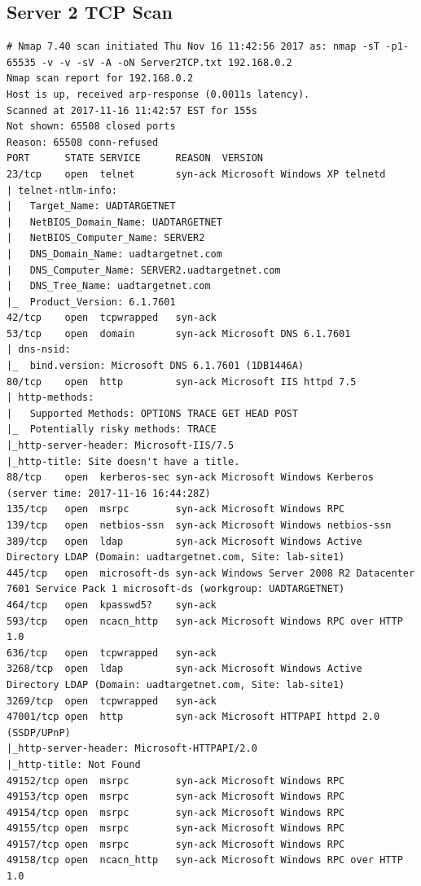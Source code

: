 \documentclass[12pt,a4paper]{article}
\begin{document}
\begin{appendices}
	\subsection{Server 2 TCP Scan}
		\begin{lstlisting}
# Nmap 7.40 scan initiated Thu Nov 16 11:42:56 2017 as: nmap -sT -p1-65535 -v -v -sV -A -oN Server2TCP.txt 192.168.0.2
Nmap scan report for 192.168.0.2
Host is up, received arp-response (0.0011s latency).
Scanned at 2017-11-16 11:42:57 EST for 155s
Not shown: 65508 closed ports
Reason: 65508 conn-refused
PORT      STATE SERVICE      REASON  VERSION
23/tcp    open  telnet       syn-ack Microsoft Windows XP telnetd
| telnet-ntlm-info:
|   Target_Name: UADTARGETNET
|   NetBIOS_Domain_Name: UADTARGETNET
|   NetBIOS_Computer_Name: SERVER2
|   DNS_Domain_Name: uadtargetnet.com
|   DNS_Computer_Name: SERVER2.uadtargetnet.com
|   DNS_Tree_Name: uadtargetnet.com
|_  Product_Version: 6.1.7601
42/tcp    open  tcpwrapped   syn-ack
53/tcp    open  domain       syn-ack Microsoft DNS 6.1.7601
| dns-nsid:
|_  bind.version: Microsoft DNS 6.1.7601 (1DB1446A)
80/tcp    open  http         syn-ack Microsoft IIS httpd 7.5
| http-methods:
|   Supported Methods: OPTIONS TRACE GET HEAD POST
|_  Potentially risky methods: TRACE
|_http-server-header: Microsoft-IIS/7.5
|_http-title: Site doesn't have a title.
88/tcp    open  kerberos-sec syn-ack Microsoft Windows Kerberos (server time: 2017-11-16 16:44:28Z)
135/tcp   open  msrpc        syn-ack Microsoft Windows RPC
139/tcp   open  netbios-ssn  syn-ack Microsoft Windows netbios-ssn
389/tcp   open  ldap         syn-ack Microsoft Windows Active Directory LDAP (Domain: uadtargetnet.com, Site: lab-site1)
445/tcp   open  microsoft-ds syn-ack Windows Server 2008 R2 Datacenter 7601 Service Pack 1 microsoft-ds (workgroup: UADTARGETNET)
464/tcp   open  kpasswd5?    syn-ack
593/tcp   open  ncacn_http   syn-ack Microsoft Windows RPC over HTTP 1.0
636/tcp   open  tcpwrapped   syn-ack
3268/tcp  open  ldap         syn-ack Microsoft Windows Active Directory LDAP (Domain: uadtargetnet.com, Site: lab-site1)
3269/tcp  open  tcpwrapped   syn-ack
47001/tcp open  http         syn-ack Microsoft HTTPAPI httpd 2.0 (SSDP/UPnP)
|_http-server-header: Microsoft-HTTPAPI/2.0
|_http-title: Not Found
49152/tcp open  msrpc        syn-ack Microsoft Windows RPC
49153/tcp open  msrpc        syn-ack Microsoft Windows RPC
49154/tcp open  msrpc        syn-ack Microsoft Windows RPC
49155/tcp open  msrpc        syn-ack Microsoft Windows RPC
49157/tcp open  msrpc        syn-ack Microsoft Windows RPC
49158/tcp open  ncacn_http   syn-ack Microsoft Windows RPC over HTTP 1.0

\end{lstlisting}
\end{appendices}
\end{document}

